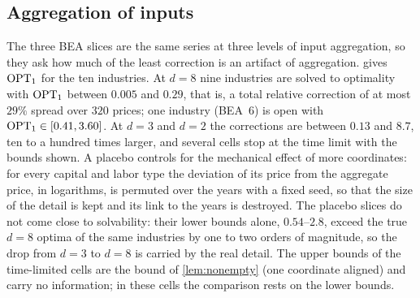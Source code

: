 \subsection{Aggregation of inputs}
The three BEA slices are the same series at three levels of input aggregation, so they ask how much of the least correction is an artifact of aggregation.  gives $\mathrm{OPT}_1$ for the ten industries. At $d=8$ nine industries are solved to optimality with $\mathrm{OPT}_1$ between $0.005$ and $0.29$, that is, a total relative correction of at most $29\%$ spread over $320$ prices; one industry (BEA~6) is open with $\mathrm{OPT}_1\in[0.41,3.60]$. At $d=3$ and $d=2$ the corrections are between $0.13$ and $8.7$, ten to a hundred times larger, and several cells stop at the time limit with the bounds shown. A placebo controls for the mechanical effect of more coordinates: for every capital and labor type the deviation of its price from the aggregate price, in logarithms, is permuted over the years with a fixed seed, so that the size of the detail is kept and its link to the years is destroyed. The placebo slices do not come close to solvability: their lower bounds alone, $0.54$--$2.8$, exceed the true $d=8$ optima of the same industries by one to two orders of magnitude, so the drop from $d=3$ to $d=8$ is carried by the real detail. The upper bounds of the time-limited cells are the bound of \cref{lem:nonempty} (one coordinate aligned) and carry no information; in these cells the comparison rests on the lower bounds.

